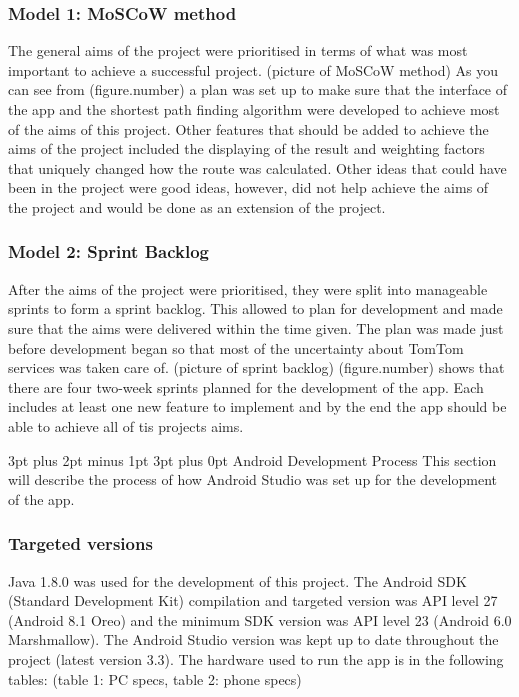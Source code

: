 \documentclass[12pt,a4paper]{article}
\makeatletter
\renewcommand\subsection{\@startsection {subsection}{1}{2mm} %
                               {3pt plus 2pt minus 1pt} %
                               {3pt plus 0pt} %
                               {\normalfont\bfseries}}
\makeatother
\begin{document}
\subsubsection{Model 1: MoSCoW method}
The general aims of the project were prioritised in terms of what was most important to achieve a successful project. (picture of MoSCoW method)
As you can see from (figure.number) a plan was set up to make sure that the interface of the app and the shortest path finding algorithm were developed to achieve most of the aims of this project. Other features that should be added to achieve the aims of the project included the displaying of the result and weighting factors that uniquely changed how the route was calculated. Other ideas that could have been in the project were good ideas, however, did not help achieve the aims of the project and would be done as an extension of the project.

\subsubsection{Model 2: Sprint Backlog}
After the aims of the project were prioritised, they were split into manageable sprints to form a sprint backlog. This allowed to plan for development and made sure that the aims were delivered within the time given. The plan was made just before development began so that most of the uncertainty about TomTom services was taken care of. (picture of sprint backlog)
(figure.number) shows that there are four two-week sprints planned for the development of the app. Each includes at least one new feature to implement and by the end the app should be able to achieve all of tis projects aims. 

\subsection{Android Development Process}
This section will describe the process of how Android Studio was set up for the development of the app.
\subsubsection{Targeted versions}
Java 1.8.0 was used for the development of this project. The Android SDK (Standard Development Kit) compilation and targeted version was API level 27 (Android 8.1 Oreo) and the minimum SDK version was API level 23 (Android 6.0 Marshmallow). The Android Studio version was kept up to date throughout the project (latest version 3.3). The hardware used to run the app is in the following tables: (table 1: PC specs, table 2: phone specs)
\end{document}
